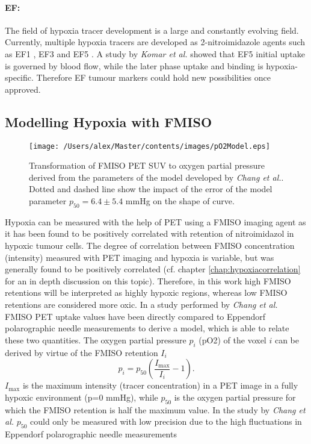 \paragraph{EF: }The field of hypoxia tracer development is a large and constantly evolving field. Currently, multiple hypoxia tracers are developed as 2-nitroimidazole agents such as EF1 \cite{pmid10688119}, EF3 \cite{pmid17334763} and EF5 \cite{pmid12552344}. A study by \textit{Komar et al.} \cite{pmid18997048} showed that EF5 initial uptake is governed by blood flow, while the later phase uptake and binding is hypoxia-specific. Therefore EF tumour markers could hold new possibilities once approved.
\subsection{Modelling Hypoxia with FMISO}
\begin{figure}[htb]
\centering
\texttt{[image: /Users/alex/Master/contents/images/pO2Model.eps]}
\vspace{1cm}
\caption{Transformation of FMISO PET SUV to oxygen partial pressure derived from the parameters of the model developed by \textit{Chang et al.}\cite{pmid19994538}. Dotted and dashed line show the impact of the error of the model parameter $p_{50} = 6.4 \pm 5.4$ mmHg on the shape of curve.}
\label{fig:pO2Model}
\end{figure}
Hypoxia can be measured with the help of PET using a FMISO imaging agent as it has been found to be positively correlated with retention of nitroimidazol in hypoxic tumour cells. The degree of correlation between FMISO concentration (intensity) measured with PET imaging and hypoxia is variable, but was generally found to be positively correlated (cf. chapter \ref{chap:hypoxiacorrelation} for an in depth discussion on this topic). Therefore, in this work high FMISO retentions will be interpreted as highly hypoxic regions, whereas low FMISO retentions are considered more oxic. In a study performed by \textit{Chang et al.} \cite{pmid19994538} FMISO PET uptake values have been directly compared to Eppendorf polarographic needle measurements to derive a model, which is able to relate these two quantities. The oxygen partial pressure $p_i$ (pO2) of the voxel $i$ can be derived by virtue of the FMISO retention $I_i$
\begin{equation}\label{eq:changmodel}
p_i = p_\mathrm{50}\left(\frac{I_\mathrm{max}}{I_i}-1\right).
\end{equation}
$I_\mathrm{max}$ is the maximum intensity (tracer concentration) in a PET image in a fully hypoxic environment (p=0 mmHg), while $p_\mathrm{50}$ is the oxygen partial pressure for which the FMISO retention is half the maximum value. In the study by \textit{Chang et al.} \cite{pmid19994538} $p_\mathrm{50}$ could only be measured with low precision due to the high fluctuations in Eppendorf polarographic needle measurements
